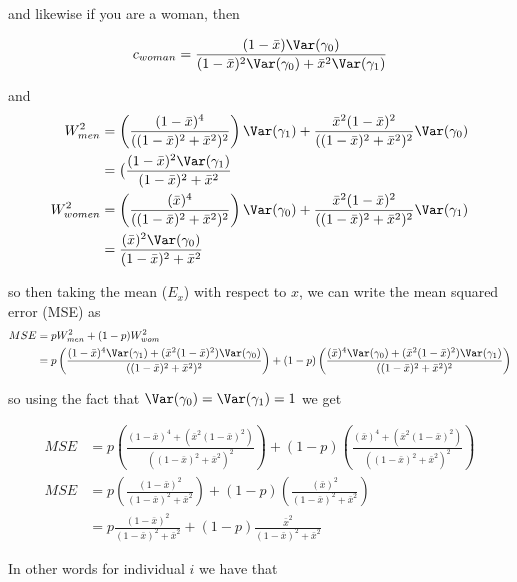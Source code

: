 and likewise if you are a woman, then

\begin{align*}
	c_{woman} = \frac{(1-\bar{x})\Var(\gamma_0)}{(1-\bar{x})^2\Var(\gamma_0) + \bar{x}^2\Var(\gamma_1)}
\end{align*}


and 
\begin{align*}
	W_{men}^2 &= \left(\frac{(1-\bar{x})^4}{((1-\bar{x})^2 + \bar{x}^2)^2}\right) \Var(\gamma_1) +  \frac{\bar{x}^2 (1-\bar{x})^2}{((1-\bar{x})^2 + \bar{x}^2)^2} \Var(\gamma_0) \\
			  &= \big(\frac{(1-\bar{x})^2 \Var(\gamma_1)} {(1-\bar{x})^2 + \bar{x}^2} \\
	W_{women}^2 &= \left(\frac{(\bar{x})^4}{((1-\bar{x})^2 + \bar{x}^2)^2}\right) \Var(\gamma_0) + \frac{\bar{x}^2 (1-\bar{x})^2}{((1-\bar{x})^2 + \bar{x}^2)^2} \Var(\gamma_1) \\
				&= \frac{(\bar{x})^2 \Var(\gamma_0) }{(1-\bar{x})^2 + \bar{x}^2} \\
\end{align*} 


so then taking the mean ($E_{x}$) with respect to $x$, we can write the mean squared error (MSE) as
\begin{align*}
	MSE &= p W_{men}^2 + (1 - p)W_{wom}^2 \\
	&= p \left(\frac{(1-\bar{x})^4\Var(\gamma_1) + ( \bar{x}^2 (1-\bar{x})^2 ) \Var(\gamma_0)}{((1-\bar{x})^2 + \bar{x}^2)^2}\right) + (1-p)\left(\frac{(\bar{x})^4 \Var(\gamma_0) + ( \bar{x}^2 (1-\bar{x})^2 ) \Var(\gamma_1) }{((1-\bar{x})^2 + \bar{x}^2)^2}\right) \\
\end{align*} 

so using the fact that $\Var(\gamma_0) = \Var(\gamma_1) = 1$ we get

\begin{align*}
	 MSE &= p \left(\frac{(1-\bar{x})^4 + ( \bar{x}^2 (1-\bar{x})^2 ) }{((1-\bar{x})^2 + \bar{x}^2)^2}\right) + (1-p)\left(\frac{(\bar{x})^4  + ( \bar{x}^2 (1-\bar{x})^2 ) }{((1-\bar{x})^2 + \bar{x}^2)^2}\right) \\
	 MSE &= p \left(\frac{(1-\bar{x})^2 }{(1-\bar{x})^2 + \bar{x}^2}\right) + (1-p)\left(\frac{(\bar{x})^2 }{(1-\bar{x})^2 + \bar{x}^2}\right) \\
			 &= p \frac{(1-\bar{x})^2}{(1-\bar{x})^2 + \bar{x}^2} + (1-p) \frac{\bar{x}^2}{(1-\bar{x})^2 + \bar{x}^2}
\end{align*} 

In other words for individual $i$ we have that

